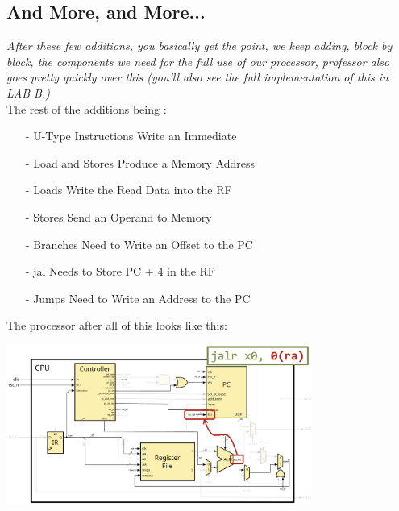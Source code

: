 \subsection{And More, and More...}
\textit{After these few additions, you basically get the point, we keep adding, block by block, the components we need for the full use of our processor, professor also goes pretty quickly over this (you'll also see the full implementation of this in LAB B.)}
\\  
The rest of the additions being : \\
\begin{itemize}
    \item[-] U-Type Instructions Write an Immediate
    \item[-] Load and Stores Produce a Memory Address
    \item[-] Loads Write the Read Data into the RF
    \item[-] Stores Send an Operand to Memory
    \item[-] Branches Need to Write an Offset to the PC
    \item[-] jal Needs to Store PC + 4 in the RF
    \item[-] Jumps Need to Write an Address to the PC
\end{itemize}
The processor after all of this looks like this:
\begin{center}
    \includegraphics[width=0.75\textwidth]{chapters/chapter2a/images/pend.png}
\end{center}

